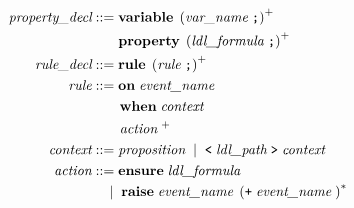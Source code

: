 \documentclass[preview=true]{standalone}
\begin{document}
\begin{table}[t]
\begin{align*}
  \textit{property\_decl} &::=
  \textbf{variable}\;
    \left( \textit{var\_name}\; \texttt{;} \right)^+
  \\&\hspace{1.9em}
  \textbf{property}\;
  \left(\textit{ldl\_formula}\; \texttt{;}\right)^+
  \\
  \textit{rule\_decl} &::= \textbf{rule}\;
  \left( \textit{rule}\; \texttt{;} \right)^+
  \\
  \textit{rule} &::=
  \textbf{on}\; \textit{event\_name}\;
  \\&\qquad
  \textbf{when}\; \textit{context}\;
  \\&\qquad
  \textit{action}\;^+
  \\
  \textit{context} &::= \textit{proposition}\;
  \mid\;
  \texttt{<}\; \textit{ldl\_path}\; \texttt{>}\; \textit{context}
  \\
  \textit{action} &::=
  \textbf{ensure}\; \textit{ldl\_formula}\;
  \\&\quad
  \mid\;
  \textbf{raise}\; \textit{event\_name}\; \left(\texttt{+}\; \textit{event\_name}\; \right)^\ast\;
  \\
\end{align*}
\end{table}
\smallskip
\end{document}
